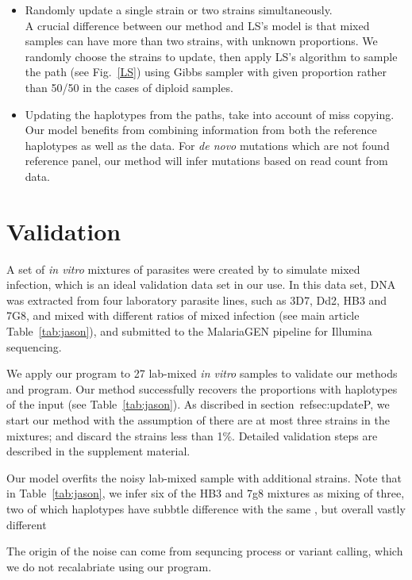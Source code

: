 \documentclass{bioinfo}
\begin{document}
\begin{methods}
\begin{itemize}
\item Randomly update a single strain or two strains simultaneously.\\
A crucial difference between our method and LS's model is that mixed samples can have more than two strains, with unknown proportions. We randomly choose the strains to update, then apply LS's algorithm to sample the path (see Fig.~\ref{LS}) using Gibbs sampler with given proportion rather than 50/50 in the cases of diploid samples.
\item Updating the haplotypes from the paths, take into account of miss copying. Our model benefits from combining information from both the reference haplotypes as well as the data. For {\em de novo} mutations which are not found reference panel, our method will infer mutations based on read count from data.


\end{itemize}

\section{Validation}
A set of {\it in vitro} mixtures of parasites were created by \citet{Wendler2015:sup} to simulate mixed infection, which is an ideal validation data set in our use. In this data set, DNA was extracted from four laboratory parasite lines, such as 3D7, Dd2, HB3 and 7G8, and mixed with different ratios of mixed infection (see main article Table~\ref{tab:jason}), and submitted to the MalariaGEN \citep{MalariaGen2008} pipeline for Illumina sequencing.

We apply our program to 27 lab-mixed {\em in vitro} samples \citep{Wendler2015} to validate our methods and program. Our method successfully recovers the proportions with haplotypes of the input (see Table~\ref{tab:jason}). As discribed in section~ref{sec:updateP}, we start our method with the assumption of there are at most three strains in the mixtures; and discard the strains less than 1\%. Detailed validation steps are described in the supplement material.

Our model overfits the noisy lab-mixed sample with additional strains. Note that in Table~\ref{tab:jason}, we infer six of the HB3 and 7g8 mixtures as mixing of three, two of which haplotypes have subbtle difference with the same , but overall vastly different

The origin of the noise can come from sequncing process or variant calling, which we do not recalabriate using our program.


\end{methods}
\end{document}

